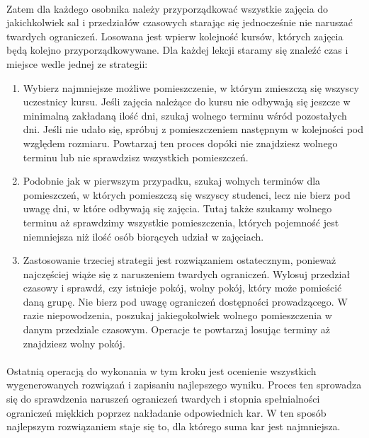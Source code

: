 \paragraph{}Zatem dla każdego osobnika należy przyporządkować wszystkie zajęcia do jakichkolwiek sal i przedziałów czasowych starając się jednocześnie nie naruszać twardych ograniczeń. Losowana jest wpierw kolejność kursów, których zajęcia będą kolejno przyporządkowywane. Dla każdej lekcji staramy się znaleźć czas i miejsce wedle jednej ze strategii:
\begin{enumerate}
\item Wybierz najmniejsze możliwe pomieszczenie, w którym zmieszczą się wszyscy uczestnicy kursu. Jeśli zajęcia należące do kursu nie odbywają się jeszcze w minimalną zakładaną ilość dni, szukaj wolnego terminu wśród pozostałych dni. Jeśli nie udało się, spróbuj z pomieszczeniem następnym w kolejności pod względem rozmiaru. Powtarzaj ten proces dopóki nie znajdziesz wolnego terminu lub nie sprawdzisz wszystkich pomieszczeń.
\item Podobnie jak w pierwszym przypadku, szukaj wolnych terminów dla pomieszczeń, w których pomieszczą się wszyscy studenci, lecz nie bierz pod uwagę dni, w które odbywają się zajęcia. Tutaj także szukamy wolnego terminu aż sprawdzimy wszystkie pomieszczenia, których pojemność jest niemniejsza niż ilość osób biorących udział w zajęciach.
\item Zastosowanie trzeciej strategii jest rozwiązaniem ostatecznym, ponieważ najczęściej wiąże się z naruszeniem twardych ograniczeń.  Wylosuj przedział czasowy i sprawdź, czy istnieje pokój, wolny pokój, który może pomieścić daną grupę. Nie bierz pod uwagę ograniczeń dostępności prowadzącego. W razie niepowodzenia, poszukaj jakiegokolwiek wolnego pomieszczenia w danym przedziale czasowym. Operacje te powtarzaj losując terminy aż znajdziesz wolny pokój.
\end{enumerate}
\paragraph{}Ostatnią operacją do wykonania w tym kroku jest ocenienie wszystkich wygenerowanych rozwiązań i zapisaniu najlepszego wyniku. Proces ten sprowadza się do sprawdzenia naruszeń ograniczeń twardych i stopnia spełnialności ograniczeń miękkich poprzez nakładanie odpowiednich kar. W ten sposób najlepszym rozwiązaniem staje się to, dla którego suma kar jest najmniejsza.
